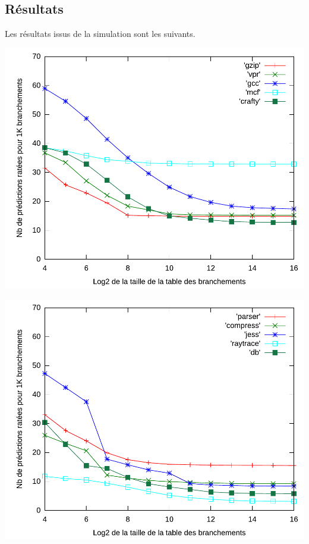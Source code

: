 \documentclass[a4paper]{article}
\begin{document}
\subsection{Résultats}
Les résultats issus de la simulation sont les suivants.
\par
\begin{minipage}{.48\linewidth}
\includegraphics[width=\linewidth]{2-bit-0}
\end{minipage}%
\hfill
\begin{minipage}{.48\linewidth}
\includegraphics[width=\linewidth]{2-bit-1}
\end{minipage}
\end{document}
